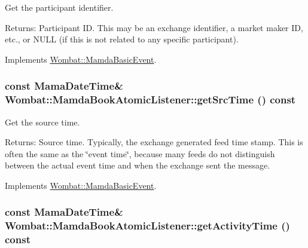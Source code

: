 Get the participant identifier. 

\begin{Desc}
\item[Returns:]Participant ID. This may be an exchange identifier, a market maker ID, etc., or NULL (if this is not related to any specific participant). \end{Desc}


Implements \hyperlink{classWombat_1_1MamdaBasicEvent_94e531c6ae9ae7798725db14facbd6e2}{Wombat::Mamda\-Basic\-Event}.\hypertarget{classWombat_1_1MamdaBookAtomicListener_a43104e4c912b926990c05ff0f35ef02}{
\subsubsection[getSrcTime]{\setlength{\rightskip}{0pt plus 5cm}const Mama\-Date\-Time\& Wombat::Mamda\-Book\-Atomic\-Listener::get\-Src\-Time () const}}
\label{classWombat_1_1MamdaBookAtomicListener_a43104e4c912b926990c05ff0f35ef02}


Get the source time. 

\begin{Desc}
\item[Returns:]Source time. Typically, the exchange generated feed time stamp. This is often the same as the \char`\"{}event time\char`\"{}, because many feeds do not distinguish between the actual event time and when the exchange sent the message. \end{Desc}


Implements \hyperlink{classWombat_1_1MamdaBasicEvent_60b5d51f3799c4762090505ef5b213e9}{Wombat::Mamda\-Basic\-Event}.\hypertarget{classWombat_1_1MamdaBookAtomicListener_84a6cb534ed359f19138a48d9f1f2812}{
\subsubsection[getActivityTime]{\setlength{\rightskip}{0pt plus 5cm}const Mama\-Date\-Time\& Wombat::Mamda\-Book\-Atomic\-Listener::get\-Activity\-Time () const}}
\label{classWombat_1_1MamdaBookAtomicListener_84a6cb534ed359f19138a48d9f1f2812}


